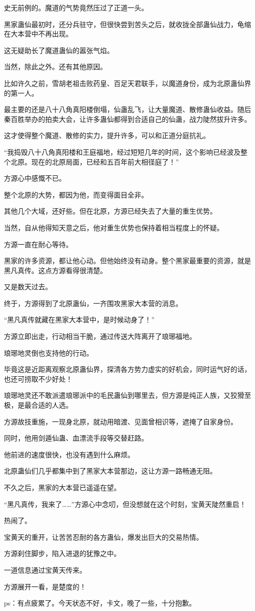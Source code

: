 \begin{this_body}
史无前例的。魔道的气势竟然压过了正道一头。

黑家蛊仙最初时，还分兵驻守，但很快尝到苦头之后，就收拢全部蛊仙战力，龟缩在大本营中不再出现。

这无疑助长了魔道蛊仙的嚣张气焰。

当然，除此之外。还有其他原因。

比如许久之前，雪胡老祖击败药皇、百足天君联手，以魔道身份，成为北原蛊仙界的第一人。

最主要的还是八十八角真阳楼倒塌，仙蛊乱飞，让大量魔道、散修蛊仙收益。随后秦百胜举办的拍卖大会，让许多蛊仙都得到合适自己的仙蛊，战力陡然拔升许多。

这才使得整个魔道、散修的实力，提升许多，可以和正道分庭抗礼。

“我捣毁八十八角真阳楼和王庭福地，经过短短几年的时间，这个影响已经波及整个北原。现在的北原局面，已经和五百年前大相径庭了！”

方源心中感慨不已。

整个北原的大势，都因为他，而变得面目全非。

其他几个大域，还好些。但在北原，方源已经失去了大量的重生优势。

当然，自从他得知天意之后，他对重生优势也保持着相当程度上的怀疑。

方源一直在耐心等待。

黑家的许多资源，都让他心动。但他始终没有动身。整个黑家最重要的资源，就是黑凡真传。这点方源看得很清楚。

又是数天过去。

终于，方源得到了北原蛊仙，一齐围攻黑家大本营的消息。

“黑凡真传就藏在黑家大本营中，是时候动身了！”

方源立即出走，行动相当干脆，通过传送大阵离开了琅琊福地。

琅琊地灵倒也支持他的行动。

毕竟这是近距离观察北原蛊仙界，探清各方势力虚实的好机会，同时运气好的话，也还可捞取不少好处！

琅琊地灵还不敢派遣琅琊派中的毛民蛊仙到哪里去，但方源是纯正人族，又狡猾至极，是最合适的人选。

方源故技重施，一现身北原，就动用暗渡、见面曾相识等，遮掩了自家身份。

同时，他用剑遁仙蛊、血漂流手段等交替赶路。

他前进的速度很快，也没有遇到什么麻烦。

北原蛊仙们几乎都集中到了黑家大本营那边，这让方源一路畅通无阻。

不久之后，黑家的大本营已遥遥在望。

“黑凡真传，我来了……”方源心中念叨，但没想就在这个时刻，宝黄天陡然重启！

热闹了。

宝黄天的重开，让苦苦忍耐的各方蛊仙，爆发出巨大的交易热情。

方源刹住脚步，陷入进退的犹豫之中。

一道信息通过宝黄天传来。

方源展开一看，是楚度的！

ps：有点疲累了。今天状态不好，卡文，晚了一些，十分抱歉。

\end{this_body}

